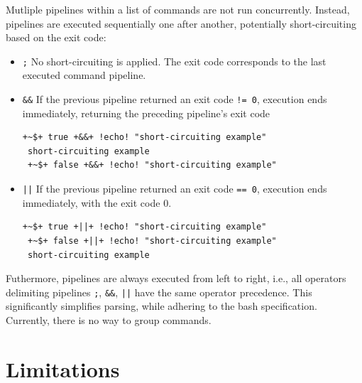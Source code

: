 Mutliple pipelines within a list of commands are not run concurrently. Instead, pipelines are executed sequentially one after another, potentially short-circuiting based on the exit code:
\begin{itemize}
	\item \texttt{;} No short-circuiting is applied. The exit code corresponds to the last executed command pipeline.
	\item \texttt{\&\&} If the previous pipeline returned an exit code \texttt{!= 0}, execution ends immediately, returning the preceding pipeline's exit code
\begin{lstlisting}[style=ShellInputStyle, deletekeywords={run, command, wc, echo}]
 +~$+ true +&&+ !echo! "short-circuiting example"
 short-circuiting example
 +~$+ false +&&+ !echo! "short-circuiting example"
\end{lstlisting}
	\item \texttt{||} If the previous pipeline returned an exit code \texttt{== 0}, execution ends immediately, with the exit code $0$.
\begin{lstlisting}[style=ShellInputStyle, deletekeywords={run, command, wc, echo}]
 +~$+ true +||+ !echo! "short-circuiting example"
 +~$+ false +||+ !echo! "short-circuiting example"
 short-circuiting example
\end{lstlisting}
\end{itemize}

Futhermore, pipelines are always executed from left to right, i.e., all operators delimiting pipelines \texttt{;}, \texttt{\&\&}, \texttt{||} have the same operator precedence. This significantly simplifies parsing, while adhering to the bash specification. Currently, there is no way to group commands.

\section{Limitations}


